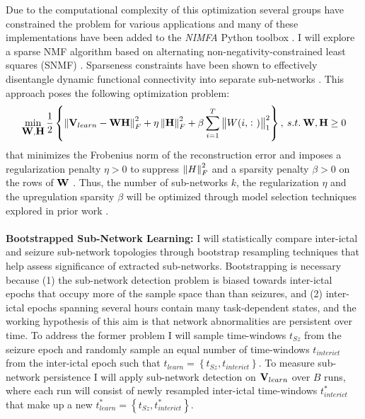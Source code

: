 Due to the computational complexity of this optimization several groups have constrained the problem for various applications and many of these implementations have been added to the \textit{NIMFA} Python toolbox \cite{zitnik2012nimfa}. I will explore a sparse NMF algorithm based on alternating non-negativity-constrained least squares (SNMF) \cite{kim2007sparse}. Sparseness constraints have been shown to effectively disentangle dynamic functional connectivity into separate sub-networks \cite{leonardi2014disentangling}. This approach poses the following optimization problem:
\begin{eqnarray}
    \label{eqn:snmf}
    \min_{\mathbf{\displaystyle W},\mathbf{\displaystyle H}} \frac{\displaystyle 1}{\displaystyle 2} \left\{\left\|{\displaystyle \mathbf{\displaystyle V}_{learn}-\mathbf{\displaystyle W}\mathbf{\displaystyle H}}\right\|^2_F + \eta\left\|{\displaystyle \mathbf{\displaystyle H}}\right\|^2_F +\beta\sum_{i=1}^{T}\left\|{\displaystyle W(i,\colon)}\right\|_1^2\right\}, \: s.t. \: \mathbf{\displaystyle W},\mathbf{\displaystyle H} \geq 0
\end{eqnarray}
that minimizes the Frobenius norm of the reconstruction error and imposes a regularization penalty $\eta>0$ to suppress $\left\|{\displaystyle H}\right\|_F^2$ and a sparsity penalty $\beta>0$ on the rows of $\mathbf{\displaystyle W}$ \cite{kim2007sparse}. Thus, the number of sub-networks $k$, the regularization $\eta$ and the upregulation sparsity $\beta$ will be optimized through model selection techniques explored in prior work \cite{brunet2004metagenes, kim2007sparse}. 
~\\
~\\
\textbf{Bootstrapped Sub-Network Learning:}
I will statistically compare inter-ictal and seizure sub-network topologies through bootstrap resampling techniques that help assess significance of extracted sub-networks. Bootstrapping is necessary because (1) the sub-network detection problem is biased towards inter-ictal epochs that occupy more of the sample space than than seizures, and (2) inter-ictal epochs spanning several hours contain many task-dependent states, and the working hypothesis of this aim is that network abnormalities are persistent over time. To address the former problem I will sample time-windows $t_{Sz}$ from the seizure epoch and randomly sample an equal number of time-windows $t_{interict}$ from the inter-ictal epoch such that $t_{learn}=\left\{t_{Sz}, t_{interict}\right\}$. To measure sub-network persistence I will apply sub-network detection on $\mathbf{\displaystyle V}_{learn}$ over $B$ runs, where each run will consist of newly resampled inter-ictal time-windows $t^{*}_{interict}$ that make up a new $t^{*}_{learn}=\left\{t_{Sz}, t^{*}_{interict}\right\}$.

